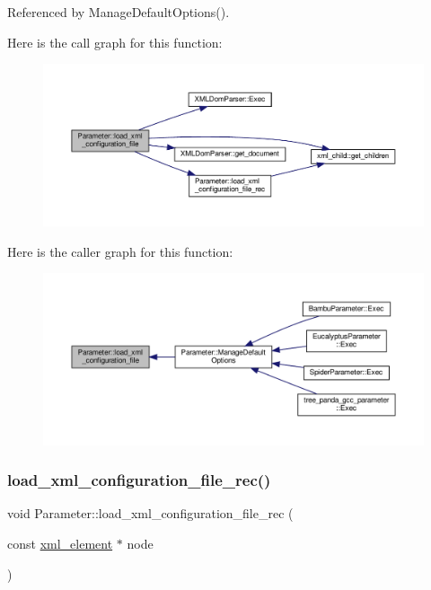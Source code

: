 Referenced by Manage\+Default\+Options().

Here is the call graph for this function\+:
\nopagebreak
\begin{figure}[H]
\begin{center}
\leavevmode
\includegraphics[width=350pt]{dc/dab/classParameter_a7e7dfa3795e73f61f5f4ff92732f58c2_cgraph}
\end{center}
\end{figure}
Here is the caller graph for this function\+:
\nopagebreak
\begin{figure}[H]
\begin{center}
\leavevmode
\includegraphics[width=350pt]{dc/dab/classParameter_a7e7dfa3795e73f61f5f4ff92732f58c2_icgraph}
\end{center}
\end{figure}
\mbox{\label{classParameter_a94dba91fe31d3e03c118b67d2d076120}} 
\subsubsection{\texorpdfstring{load\+\_\+xml\+\_\+configuration\+\_\+file\+\_\+rec()}{load\_xml\_configuration\_file\_rec()}}
{\footnotesize\ttfamily void Parameter\+::load\+\_\+xml\+\_\+configuration\+\_\+file\+\_\+rec (\begin{DoxyParamCaption}\item[{const \hyperlink{classxml__element}{xml\+\_\+element} $\ast$}]{node }\end{DoxyParamCaption})\hspace{0.3cm}{\ttfamily [protected]}}



